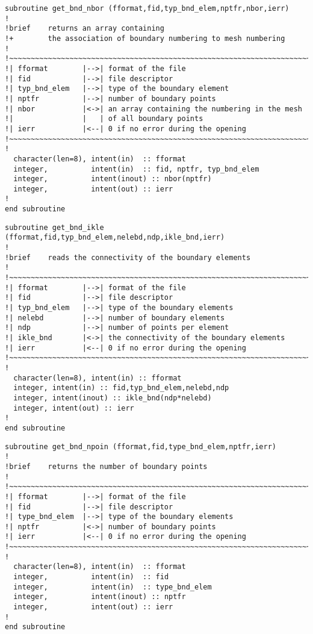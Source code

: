 %
\begin{lstlisting}
subroutine get_bnd_nbor (fformat,fid,typ_bnd_elem,nptfr,nbor,ierr)
!
!brief    returns an array containing
!+        the association of boundary numbering to mesh numbering
!
!~~~~~~~~~~~~~~~~~~~~~~~~~~~~~~~~~~~~~~~~~~~~~~~~~~~~~~~~~~~~~~~~~~~~~~~
!| fformat        |-->| format of the file
!| fid            |-->| file descriptor
!| typ_bnd_elem   |-->| type of the boundary element
!| nptfr          |-->| number of boundary points
!| nbor           |<->| an array containing the numbering in the mesh
!|                |   | of all boundary points
!| ierr           |<--| 0 if no error during the opening
!~~~~~~~~~~~~~~~~~~~~~~~~~~~~~~~~~~~~~~~~~~~~~~~~~~~~~~~~~~~~~~~~~~~~~~~
!
  character(len=8), intent(in)  :: fformat
  integer,          intent(in)  :: fid, nptfr, typ_bnd_elem
  integer,          intent(inout) :: nbor(nptfr)
  integer,          intent(out) :: ierr
!
end subroutine
\end{lstlisting}
%
\begin{lstlisting}
subroutine get_bnd_ikle (fformat,fid,typ_bnd_elem,nelebd,ndp,ikle_bnd,ierr)
!
!brief    reads the connectivity of the boundary elements
!
!~~~~~~~~~~~~~~~~~~~~~~~~~~~~~~~~~~~~~~~~~~~~~~~~~~~~~~~~~~~~~~~~~~~~~~~
!| fformat        |-->| format of the file
!| fid            |-->| file descriptor
!| typ_bnd_elem   |-->| type of the boundary elements
!| nelebd         |-->| number of boundary elements
!| ndp            |-->| number of points per element
!| ikle_bnd       |<->| the connectivity of the boundary elements
!| ierr           |<--| 0 if no error during the opening
!~~~~~~~~~~~~~~~~~~~~~~~~~~~~~~~~~~~~~~~~~~~~~~~~~~~~~~~~~~~~~~~~~~~~~~~
!
  character(len=8), intent(in) :: fformat
  integer, intent(in) :: fid,typ_bnd_elem,nelebd,ndp
  integer, intent(inout) :: ikle_bnd(ndp*nelebd)
  integer, intent(out) :: ierr
!
end subroutine
\end{lstlisting}
%
\begin{lstlisting}
subroutine get_bnd_npoin (fformat,fid,type_bnd_elem,nptfr,ierr)
!
!brief    returns the number of boundary points
!
!~~~~~~~~~~~~~~~~~~~~~~~~~~~~~~~~~~~~~~~~~~~~~~~~~~~~~~~~~~~~~~~~~~~~~~~
!| fformat        |-->| format of the file
!| fid            |-->| file descriptor
!| type_bnd_elem  |-->| type of the boundary elements
!| nptfr          |<->| number of boundary points
!| ierr           |<--| 0 if no error during the opening
!~~~~~~~~~~~~~~~~~~~~~~~~~~~~~~~~~~~~~~~~~~~~~~~~~~~~~~~~~~~~~~~~~~~~~~~
!
  character(len=8), intent(in)  :: fformat
  integer,          intent(in)  :: fid
  integer,          intent(in)  :: type_bnd_elem
  integer,          intent(inout) :: nptfr
  integer,          intent(out) :: ierr
!
end subroutine
\end{lstlisting}
